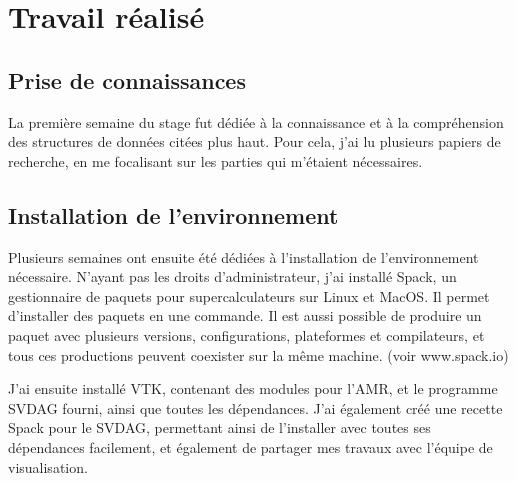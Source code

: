 \documentclass[12pt,a4paper,twoside]{article}
\begin{document}
    \begin{figure}[H]
    \end{figure}

    \newpage
    \section{Travail réalisé}

    \subsection{Prise de connaissances}

    La première semaine du stage fut dédiée à la connaissance et à la compréhension des structures de données citées plus haut.
    Pour cela, j'ai lu plusieurs papiers de recherche, en me focalisant sur les parties qui m'étaient nécessaires.

    \subsection{Installation de l'environnement}

    Plusieurs semaines ont ensuite été dédiées à l'installation de l'environnement nécessaire.
    N'ayant pas les droits d'administrateur, j'ai installé Spack, un gestionnaire de paquets pour supercalculateurs sur Linux et MacOS.
    Il permet d'installer des paquets en une commande. Il est aussi possible de produire un paquet avec plusieurs versions, configurations,
    plateformes et compilateurs, et tous ces productions peuvent coexister sur la même machine. (voir www.spack.io)


    J'ai ensuite installé VTK, contenant des modules pour l'AMR, et le programme SVDAG fourni, ainsi que toutes les dépendances. J'ai également
    créé une recette Spack pour le SVDAG, permettant ainsi de l'installer avec toutes ses dépendances facilement, et également
    de partager mes travaux avec l'équipe de visualisation.
\end{document}
